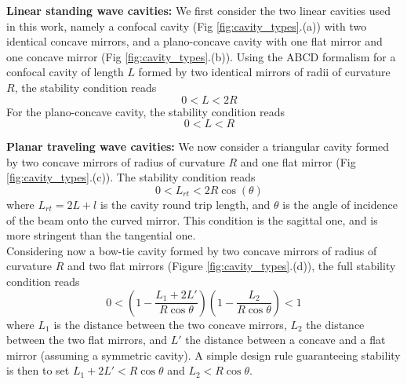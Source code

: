 \noindent \textbf{Linear standing wave cavities:} We first consider the two linear cavities used in this work, namely a confocal cavity (Fig \ref{fig:cavity_types}.(a)) with two identical concave mirrors, and a plano-concave cavity with one flat mirror and one concave mirror  (Fig \ref{fig:cavity_types}.(b)). Using the ABCD formalism for a confocal cavity of length $L$ formed by two identical mirrors of radii of curvature $R$, the stability condition reads
\begin{equation}
   \quad 0 < L < 2R
\end{equation}
For the plano-concave cavity, the stability condition reads
\begin{equation}
\quad 0 < L < R
\end{equation}

\noindent \textbf{Planar traveling wave cavities:} We now consider a triangular cavity formed by two concave mirrors of radius of curvature $R$ and one flat mirror  (Fig \ref{fig:cavity_types}.(c)). The stability condition reads
\begin{equation}
   \quad 0 < L_{rt} < 2R \cos(\theta)
\end{equation}
where $L_{rt} = 2L + l$ is the cavity round trip length, and $\theta$ is the angle of incidence of the beam onto the curved mirror. This condition is the sagittal one, and is more stringent than the tangential one.\\

Considering now a bow-tie cavity formed by two concave mirrors of radius of curvature $R$ and two flat mirrors  (Figure \ref{fig:cavity_types}.(d)), the full stability condition reads
\begin{equation}
  0 < \left( 1 - \frac{L_1 + 2L'}{R \cos\theta} \right) \left( 1 - \frac{L_2}{R \cos\theta} \right) < 1
\end{equation}
where $L_1$ is the distance between the two concave mirrors, $L_2$ the distance between the two flat mirrors, and $L'$ the distance between a concave and a flat mirror (assuming a symmetric cavity). A simple design rule guaranteeing stability is then to set $L_1 + 2L' < R \cos\theta$ and $L_2 < R \cos\theta$.\\


